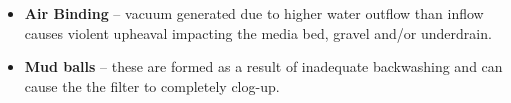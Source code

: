 \begin{itemize}
\begin{itemize}
 







\item \textbf{Air Binding} – vacuum generated due to higher water outflow than inflow causes violent upheaval impacting the media bed, gravel and/or underdrain.

 

\item \textbf{Mud balls} – these are formed as a result of inadequate backwashing and can cause the the filter to completely clog-up.

\end{itemize}
\end{itemize}

